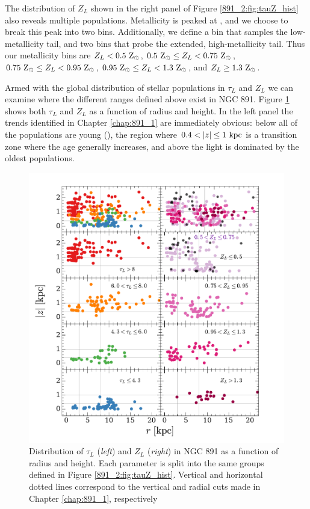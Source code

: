 The distribution of $Z_L$ shown in the right panel of Figure
\ref{891_2:fig:tauZ_hist} also reveals multiple
populations. Metallicity is peaked at , and we choose
to break this peak into two bins. Additionally, we define a bin that
samples the low-metallicity tail, and two bins that probe the
extended, high-metallicity tail. Thus our metallicity bins are $Z_L <
0.5~\mathrm{\mathrm{Z}_{\odot}} $, $0.5~\mathrm{\mathrm{Z}_{\odot}} \leq Z_L < 0.75~\mathrm{\mathrm{Z}_{\odot}} $,
$0.75~\mathrm{\mathrm{Z}_{\odot}} \leq Z_L < 0.95~\mathrm{\mathrm{Z}_{\odot}} $,
$0.95~\mathrm{\mathrm{Z}_{\odot}} \leq Z_L < 1.3~\mathrm{\mathrm{Z}_{\odot}} $, and $Z_L
\geq1.3~\mathrm{\mathrm{Z}_{\odot}} $.

Armed with the global distribution of stellar populations in $\tau_L$
and $Z_L$ we can examine where the different ranges defined above
exist in NGC 891. Figure \ref{891_2:fig:rz_tZ} shows both $\tau_L$ and
$Z_L$ as a function of radius and height. In the left panel the trends
identified in Chapter \ref{chap:891_1} are immediately obvious: below
 all of the populations are young (), the
region where $0.4 < |z| \leq 1~\mathrm{kpc} $ is a transition zone where
the age generally increases, and above  the light is
dominated by the oldest populations.

\begin{figure}
  \centering
  \includegraphics[width=\textwidth]{891_2/figs/rz_tZ.pdf}
  \caption[Distribution of $\tau_L$ and $Z_L$ as function of
    ($r,|z|$)]{\fixspacing\label{891_2:fig:rz_tZ}Distribution of
    $\tau_L$ (\emph{left}) and $Z_L$ (\emph{right}) in NGC 891 as a
    function of radius and height. Each parameter is split into the
    same groups defined in Figure \ref{891_2:fig:tauZ_hist}. Vertical
    and horizontal dotted lines correspond to the vertical and radial
    cuts made in Chapter \ref{chap:891_1}, respectively}
\end{figure}

